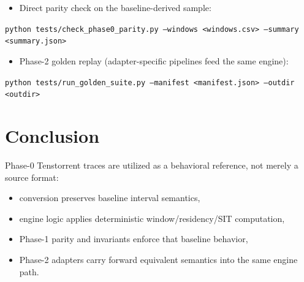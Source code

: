 \documentclass[11pt,a4paper]{article}
\begin{document}
\begin{itemize}[leftmargin=*]
  \item Direct parity check on the baseline-derived sample:
\end{itemize}
\noindent\texttt{python tests/check\_phase0\_parity.py --windows <windows.csv> --summary <summary.json>}

\begin{itemize}[leftmargin=*]
  \item Phase-2 golden replay (adapter-specific pipelines feed the same engine):
\end{itemize}
\noindent\texttt{python tests/run\_golden\_suite.py --manifest <manifest.json> --outdir <outdir>}

\section{Conclusion}
Phase-0 Tenstorrent traces are utilized as a behavioral reference, not merely a source format:
\begin{itemize}[leftmargin=*]
  \item conversion preserves baseline interval semantics,
  \item engine logic applies deterministic window/residency/SIT computation,
  \item Phase-1 parity and invariants enforce that baseline behavior,
  \item Phase-2 adapters carry forward equivalent semantics into the same engine path.
\end{itemize}
\end{document}
